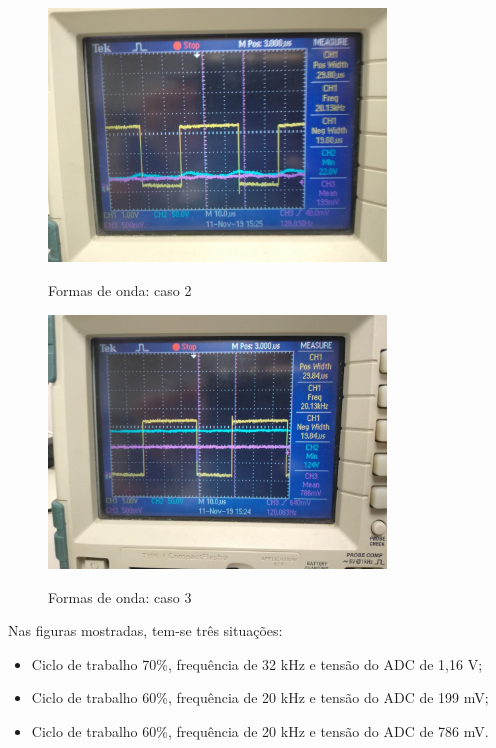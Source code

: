 \begin{figure}[H]
    \centering
    \caption{Formas de onda: caso 2}
    \includegraphics[width=0.8\textwidth]{./dados/figuras/onda_controller_2}
    \label{fig:figura-onda_controller_2}
\end{figure}

\begin{figure}[H]
    \centering
    \caption{Formas de onda: caso 3}
    \includegraphics[width=0.8\textwidth]{./dados/figuras/onda_controller_3}
    \label{fig:figura-onda_controller_3}
\end{figure}

Nas figuras mostradas, tem-se três situações: 
\bigskip
\begin{itemize}
    \item Ciclo de trabalho 70\%, frequência de 32 kHz e tensão do ADC de 1,16 V;
    \item Ciclo de trabalho 60\%, frequência de 20 kHz e tensão do ADC de 199 mV;
    \item Ciclo de trabalho 60\%, frequência de 20 kHz e tensão do ADC de 786 mV.
\end{itemize}
\bigskip


